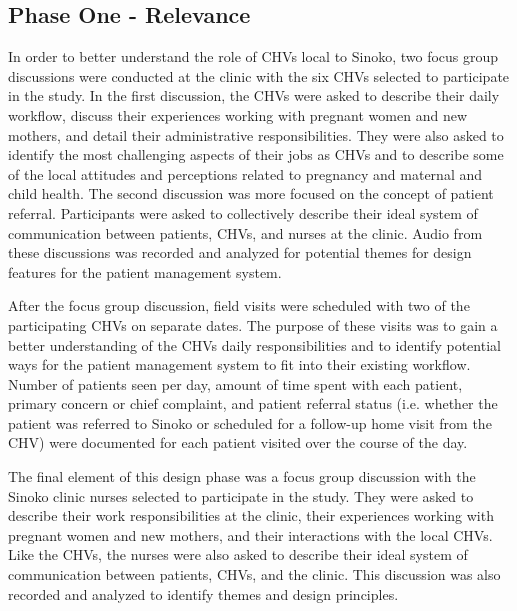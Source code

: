 \subsection{Phase One - Relevance}
In order to better understand the role of CHVs local to Sinoko, two focus group discussions were conducted at the clinic with the six CHVs selected to participate in the study. In the first discussion, the CHVs were asked to describe their daily workflow, discuss their experiences working with pregnant women and new mothers, and detail their administrative responsibilities. They were also asked to identify the most challenging aspects of their jobs as CHVs and to describe some of the local attitudes and perceptions related to pregnancy and maternal and child health. The second discussion was more focused on the concept of patient referral. Participants were asked to collectively describe their ideal system of communication between patients, CHVs, and nurses at the clinic. Audio from these discussions was recorded and analyzed for potential themes for design features for the patient management system. 

After the focus group discussion, field visits were scheduled with two of the participating CHVs on separate dates. The purpose of these visits was to gain a better understanding of the CHVs daily responsibilities and to identify potential ways for the patient management system to fit into their existing workflow. Number of patients seen per day, amount of time spent with each patient, primary concern or chief complaint, and patient referral status (i.e. whether the patient was referred to Sinoko or scheduled for a follow-up home visit from the CHV) were documented for each patient visited over the course of the day. 

The final element of this design phase was a focus group discussion with the Sinoko clinic nurses selected to participate in the study. They were asked to describe their work responsibilities at the clinic, their experiences working with pregnant women and new mothers, and their interactions with the local CHVs. Like the CHVs, the nurses were also asked to  describe their ideal system of communication between patients, CHVs, and the clinic. This discussion was also recorded and analyzed to identify themes and design principles. 



